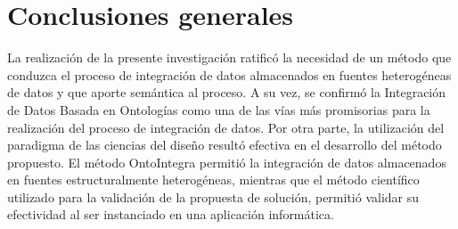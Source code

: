\chapter*{\large Conclusiones generales}



La realización de la presente investigación ratificó la necesidad de un método que conduzca el proceso de integración de datos almacenados en fuentes heterogéneas de datos y que aporte semántica al proceso. A su vez, se confirmó la Integración de Datos Basada en Ontologías como una de las vías más promisorias para la realización del proceso de integración de datos. Por otra parte, la utilización del paradigma de las ciencias del diseño resultó efectiva en el desarrollo del método propuesto. El método OntoIntegra permitió la integración de datos almacenados en fuentes estructuralmente heterogéneas, mientras que el método científico utilizado para la validación de la propuesta de solución, permitió validar su efectividad al ser instanciado en una aplicación informática.